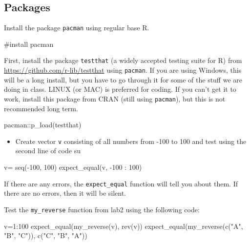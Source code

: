 \documentclass[
]{article}
\newenvironment{Shaded}{\begin{snugshade}}{\end{snugshade}}
\newcommand{\DecValTok}[1]{\textcolor[rgb]{0.00,0.00,0.81}{#1}}
\newcommand{\FunctionTok}[1]{\textcolor[rgb]{0.00,0.00,0.00}{#1}}
\newcommand{\NormalTok}[1]{#1}
\newcommand{\OtherTok}[1]{\textcolor[rgb]{0.56,0.35,0.01}{#1}}
\newcommand{\SpecialCharTok}[1]{\textcolor[rgb]{0.00,0.00,0.00}{#1}}
\newcommand{\StringTok}[1]{\textcolor[rgb]{0.31,0.60,0.02}{#1}}
\providecommand{\tightlist}{%
  \setlength{\itemsep}{0pt}\setlength{\parskip}{0pt}}
\begin{document}
\hypertarget{packages}{%
\subsection{Packages}\label{packages}}

Install the package \texttt{pacman} using regular base R.

\#install pacman

First, install the package \texttt{testthat} (a widely accepted testing
suite for R) from \url{https://github.com/r-lib/testthat} using
\texttt{pacman}. If you are using Windows, this will be a long install,
but you have to go through it for some of the stuff we are doing in
class. LINUX (or MAC) is preferred for coding. If you can't get it to
work, install this package from CRAN (still using \texttt{pacman}), but
this is not recommended long term.

\begin{Shaded}
\begin{Highlighting}[]
\NormalTok{pacman}\SpecialCharTok{::}\FunctionTok{p\_load}\NormalTok{(testthat)}
\end{Highlighting}
\end{Shaded}

\begin{itemize}
\tightlist
\item
  Create vector \texttt{v} consisting of all numbers from -100 to 100
  and test using the second line of code su
\end{itemize}

\begin{Shaded}
\begin{Highlighting}[]
\NormalTok{v}\OtherTok{=} \FunctionTok{seq}\NormalTok{(}\SpecialCharTok{{-}}\DecValTok{100}\NormalTok{, }\DecValTok{100}\NormalTok{)}
\FunctionTok{expect\_equal}\NormalTok{(v, }\SpecialCharTok{{-}}\DecValTok{100} \SpecialCharTok{:} \DecValTok{100}\NormalTok{)}
\end{Highlighting}
\end{Shaded}

If there are any errors, the \texttt{expect\_equal} function will tell
you about them. If there are no errors, then it will be silent.

Test the \texttt{my\_reverse} function from lab2 using the following
code:

\begin{Shaded}
\begin{Highlighting}[]
\NormalTok{v}\OtherTok{=}\DecValTok{1}\SpecialCharTok{:}\DecValTok{100}
\FunctionTok{expect\_equal}\NormalTok{(}\FunctionTok{my\_reverse}\NormalTok{(v), }\FunctionTok{rev}\NormalTok{(v))}
\FunctionTok{expect\_equal}\NormalTok{(}\FunctionTok{my\_reverse}\NormalTok{(}\FunctionTok{c}\NormalTok{(}\StringTok{"A"}\NormalTok{, }\StringTok{"B"}\NormalTok{, }\StringTok{"C"}\NormalTok{)), }\FunctionTok{c}\NormalTok{(}\StringTok{"C"}\NormalTok{, }\StringTok{"B"}\NormalTok{, }\StringTok{"A"}\NormalTok{))}
\end{Highlighting}
\end{Shaded}
\end{document}
